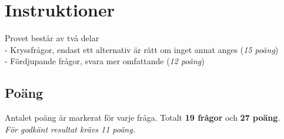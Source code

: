 \documentclass{exam}
\begin{document}
\section*{Instruktioner}
Provet består av två delar \\
    - Kryssfrågor, endast ett alternativ är rätt om inget annat anges (\textit{15 poäng})\\
    - Fördjupande frågor, svara mer omfattande (\textit{12 poäng})

\subsection*{Poäng}
Antalet poäng är markerat för varje fråga. Totalt \textbf{19 frågor} och \textbf{27 poäng}.\\ \textit{För godkänt resultat krävs 11 poäng.}

\vspace{5mm} %
\begin{center}
\end{center}
\vspace{5mm} %
\end{document}
